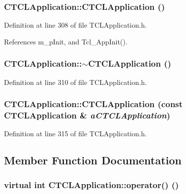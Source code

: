 \subsubsection{\setlength{\rightskip}{0pt plus 5cm}CTCLApplication::CTCLApplication ()\hspace{0.3cm}{\tt  [inline]}}\label{classCTCLApplication_a0}




Definition at line 308 of file TCLApplication.h.

References m\_\-p\-Init, and Tcl\_\-App\-Init().
\subsubsection{\setlength{\rightskip}{0pt plus 5cm}CTCLApplication::$\sim$CTCLApplication ()\hspace{0.3cm}{\tt  [inline]}}\label{classCTCLApplication_a1}




Definition at line 310 of file TCLApplication.h.
\subsubsection{\setlength{\rightskip}{0pt plus 5cm}CTCLApplication::CTCLApplication (const CTCLApplication \& {\em a\-CTCLApplication})\hspace{0.3cm}{\tt  [inline]}}\label{classCTCLApplication_a2}




Definition at line 315 of file TCLApplication.h.

\subsection{Member Function Documentation}
\subsubsection{\setlength{\rightskip}{0pt plus 5cm}virtual int CTCLApplication::operator() ()\hspace{0.3cm}{\tt  [pure virtual]}}\label{classCTCLApplication_a5}


